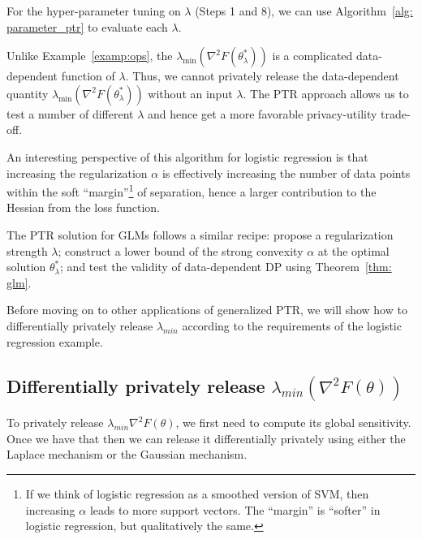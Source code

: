 \begin{example}
For the hyper-parameter tuning on $\lambda$ (Steps 1 and 8), we can use Algorithm~\ref{alg: parameter_ptr} to evaluate each $\lambda$.

Unlike Example~\ref{examp:ops}, the $\lambda_\text{min}(\nabla^2 F(\theta_\lambda^*))$ is a complicated data-dependent function of $\lambda$. Thus, we cannot privately release the data-dependent quantity $\lambda_\text{min}(\nabla^2 F(\theta_\lambda^*))$ without an input $\lambda$. The PTR approach allows us to test a number of different $\lambda$ and hence get a more favorable privacy-utility trade-off.
\end{example}
An interesting perspective of this algorithm for logistic regression is that increasing the regularization $\alpha$ is effectively increasing the number of data points within the soft ``margin''\footnote{If we think of logistic regression as a smoothed version of SVM, then increasing $\alpha$ leads to more support vectors. The ``margin'' is ``softer'' in logistic regression, but qualitatively the same.} of separation, hence a larger contribution to the Hessian from the loss function.

\begin{remark}
    The PTR solution for GLMs follows a similar recipe: propose a regularization strength $\lambda$; construct a lower bound of the strong convexity $\alpha$ at the optimal solution $\theta_\lambda^*$; and test the validity of data-dependent DP using Theorem~\ref{thm: glm}.
\end{remark}

Before moving on to other applications of generalized PTR, we will show how to differentially privately release $\lambda_{min}$ according to the requirements of the logistic regression example.

\subsection{Differentially privately release $\lambda_{min}\left(\nabla^2F(\theta)\right)$}

To privately release $\lambda_{min}{\nabla^2F(\theta)}$, we first need to compute its global sensitivity. Once we have that then we can release it differentially privately using either the Laplace mechanism or the Gaussian mechanism.

